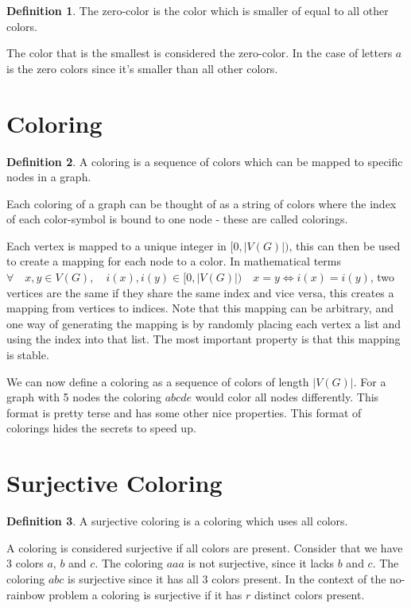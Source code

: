 \documentclass{book}
\theoremstyle{definition}
\newtheorem{definition}{Definition}[section]
\begin{document}
\begin{definition}
  The zero-color is the color which is smaller of equal to all other colors.
\end{definition}
The color that is the smallest is considered the zero-color. In the case of letters $a$ is the zero colors since it's smaller than all other colors.

\section{Coloring}
\begin{definition}
  A coloring is a sequence of colors which can be mapped to specific nodes in a graph.
\end{definition}
Each coloring of a graph can be thought of as a string of colors where the index of each color-symbol is bound to one node - these are called colorings.

Each vertex is mapped to a unique integer in $[0, |V(G)|)$, this can then be used to create a mapping for each node to a color. In mathematical terms $\forall \quad x, y \in V(G), \quad i(x), i(y) \in [0, |V(G)|) \quad x = y \iff i(x) = i(y)$, two vertices are the same if they share the same index and vice versa, this creates a mapping from vertices to indices. Note that this mapping can be arbitrary, and one way of generating the mapping is by randomly placing each vertex a list and using the index into that list. The most important property is that this mapping is stable.

We can now define a coloring as a sequence of colors of length $|V(G)|$. For a graph with 5 nodes the coloring $abcde$ would color all nodes differently. This format is pretty terse and has some other nice properties. This format of colorings hides the secrets to speed up.

\section{Surjective Coloring}
\begin{definition}
  A surjective coloring is a coloring which uses all colors.
\end{definition}
A coloring is considered surjective if all colors are present. Consider that we have 3 colors $a$, $b$ and $c$. The coloring $aaa$ is not surjective, since it lacks $b$ and $c$. The coloring $abc$ is surjective since it has all 3 colors present. In the context of the no-rainbow problem a coloring is surjective if it has $r$ distinct colors present.
\end{document}

